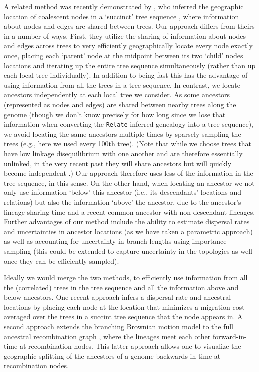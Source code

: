 \documentclass[12pt]{article}
\begin{document}
A related method was recently demonstrated by \cite{wohns2021unified}, who inferred the geographic location of coalescent nodes in a `succinct' tree sequence \citep{kelleher2018efficient}, where information about nodes and edges are shared between trees.
Our approach differs from theirs in a number of ways. 
First, they utilize the sharing of information about nodes and edges across trees to very efficiently geographically locate every node exactly once, placing each `parent' node at the midpoint between its two `child' nodes locations and iterating up the entire tree sequence simultaneously (rather than up each local tree individually).
In addition to being fast this has the advantage of using information from all the trees in a tree sequence.
In contrast, we locate ancestors independently at each local tree we consider.
As some ancestors (represented as nodes and edges) are shared between nearby trees along the genome (though we don't know precisely for how long since we lose that information when converting the \texttt{Relate}-inferred genealogy into a tree sequence), we avoid locating the same ancestors multiple times by sparsely sampling the trees (e.g., here we used every 100th tree).
(Note that while we choose trees that have low linkage disequilibrium with one another and are therefore essentially unlinked, in the very recent past they will share ancestors but will quickly become independent \citep{wakeley2012gene}.)
Our approach therefore uses less of the information in the tree sequence, in this sense.
On the other hand, when locating an ancestor we not only use information `below' this ancestor (i.e., its descendants' locations and relations) but also the information `above' the ancestor, due to the ancestor's lineage sharing time and a recent common ancestor with non-descendant lineages.
Further advantages of our method include the ability to estimate dispersal rates and uncertainties in ancestor locations (as we have taken a parametric approach) as well as accounting for uncertainty in branch lengths using importance sampling (this could be extended to capture uncertainty in the topologies as well once they can be efficiently sampled).

Ideally we would merge the two methods, to efficiently use information from all the (correlated) trees in the tree sequence and all the information above and below ancestors. 
One recent approach \citep{grundler2024geographic} infers a dispersal rate and ancestral locations by placing each node at the location that minimizes a migration cost averaged over the trees in a succint tree sequence that the node appears in.
A second approach \citep{deraje2024inferring} extends the branching Brownian motion model to the full ancestral recombination graph \citep[as inferred using a program like \texttt{ARGweaver;}][]{rasmussen2014genome}, where the lineages meet each other forward-in-time at recombination nodes. 
This latter approach allows one to visualize the geographic splitting of the ancestors of a genome backwards in time at recombination nodes.
\end{document}
